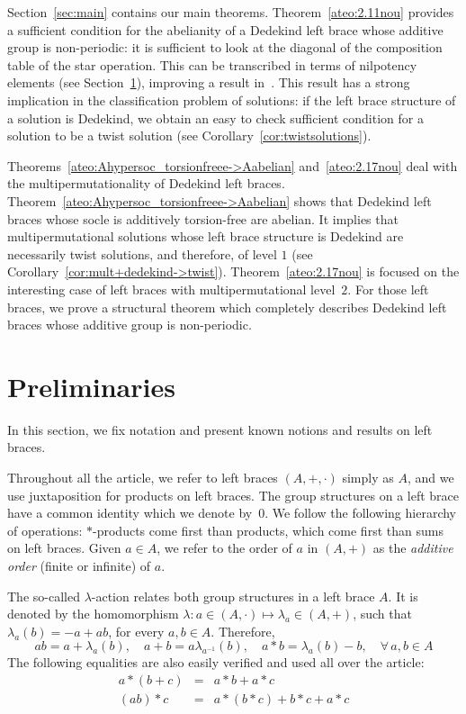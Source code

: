 \documentclass[12pt, a4paper, english]{article}
\theoremstyle{definition}
\begin{document}
Section~\ref{sec:main} contains our main theorems. Theorem~\ref{ateo:2.11nou} provides a sufficient condition for the abelianity of a Dedekind left brace whose additive group is non-periodic: it is sufficient to look at the diagonal of the composition table of the star operation. This can be transcribed in terms of nilpotency elements (see Section~\ref{sec:prelim}), improving a result in~\cite{BallesterFerraraPerezCTrombetti23-arXiv-note}. This result has a strong implication in the classification problem of solutions: if the left brace structure of a solution is Dedekind, we obtain an easy to check sufficient condition for a solution to be a twist solution (see Corollary~\ref{cor:twistsolutions}). 

Theorems~\ref{ateo:Ahypersoc_torsionfreee->Aabelian} and~\ref{ateo:2.17nou} deal with the multipermutationality of Dedekind left braces. Theorem~\ref{ateo:Ahypersoc_torsionfreee->Aabelian} shows that Dedekind left braces whose socle is additively torsion-free are abelian. It implies that multipermutational solutions whose left brace structure is Dedekind are necessarily twist solutions, and therefore, of level $1$ (see Corollary~\ref{cor:mult+dedekind->twist}). Theorem~\ref{ateo:2.17nou}  is focused on the interesting case of left braces with multipermutational level~$2$. For those left braces, we prove a structural theorem which completely describes Dedekind left braces whose additive group is non-periodic.


\section{Preliminaries}
\label{sec:prelim}

In this section, we fix notation and present known notions and results on left braces.

Throughout all the article, we refer to left braces $(A,+,\cdot)$ simply as $A$, and we use juxtaposition for products on left braces. The group structures on a left brace have a common identity which we denote by~$0$. We follow the following hierarchy of operations: $\ast$-products come first than products, which come first than sums on left braces. Given $a\in A$, we refer to the order of $a$ in $(A,+)$ as the \emph{additive order} (finite or infinite) of $a$.

The so-called $\lambda$-action relates both group structures in a left brace $A$. It is denoted by the homomorphism $\lambda \colon a \in (A,\cdot) \mapsto \lambda_a \in (A,+)$, such that  $\lambda_a(b) = -a + ab$, for every $a,b\in A$. Therefore,
\[ ab = a + \lambda_a(b), \quad a+b = a\lambda_{a^{-1}}(b), \quad a \ast b = \lambda_a(b) - b, \quad \forall\, a,b\in A\]
The following equalities are also easily verified and used all over the article:
\begin{eqnarray}
\label{ast_distesq} a \ast (b+c) & = & a \ast b + a \ast c\\
\label{ast_prod} (ab)\ast c & = & a \ast (b \ast c) + b\ast c + a \ast c
\end{eqnarray} 
\end{document}

